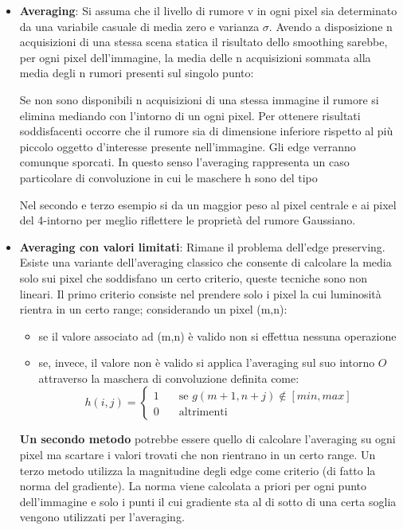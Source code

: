 \begin{itemize}
	\item \textbf{Averaging}: Si assuma che il livello di rumore v in ogni pixel sia determinato da una variabile casuale di media zero e varianza $\sigma$. Avendo a disposizione n acquisizioni di una stessa scena statica il risultato dello smoothing sarebbe, per ogni pixel dell'immagine, la media delle n acquisizioni sommata alla media degli n rumori presenti sul singolo punto:
	
	Se non sono disponibili n acquisizioni di una stessa immagine il rumore si elimina mediando con l'intorno di un ogni pixel. Per ottenere risultati soddisfacenti occorre che il rumore sia di dimensione inferiore rispetto al più piccolo oggetto d'interesse presente nell'immagine. Gli edge verranno comunque sporcati. In questo senso l'averaging rappresenta un caso particolare di convoluzione in cui le maschere h sono del tipo
	
	Nel secondo e terzo esempio si da un maggior peso al pixel centrale e ai pixel del 4-intorno per meglio riflettere le proprietà del rumore Gaussiano.
	
	\item \textbf{Averaging con valori limitati}: Rimane il problema dell'edge preserving. Esiste una variante dell'averaging classico che consente di calcolare la media solo sui pixel che soddisfano un certo criterio, queste tecniche sono non lineari. Il primo criterio consiste nel	prendere solo i pixel la cui luminosità rientra in un certo range; considerando un pixel (m,n):
	\begin{itemize}
		\item se il valore associato ad (m,n) è valido non si effettua nessuna operazione
		\item se, invece, il valore non è valido si applica l'averaging sul suo intorno $O$ attraverso la maschera di convoluzione definita come:
		$$
		h(i,j) =
		\begin{cases}
		1 & \quad \text{se } g(m + 1, n + j) \notin [min, max]\\
		0 & \quad \text{altrimenti }
		\end{cases}
		$$
	\end{itemize}
	
	\textbf{Un secondo metodo} potrebbe essere quello di calcolare l'averaging su ogni pixel ma scartare i 	valori trovati che non rientrano in un certo range. Un terzo metodo utilizza la magnitudine degli edge come criterio (di fatto la norma del gradiente). La norma viene calcolata a priori per ogni punto dell'immagine e solo i punti il cui gradiente sta al di sotto di una certa soglia vengono utilizzati per l'averaging.
	

\end{itemize}
